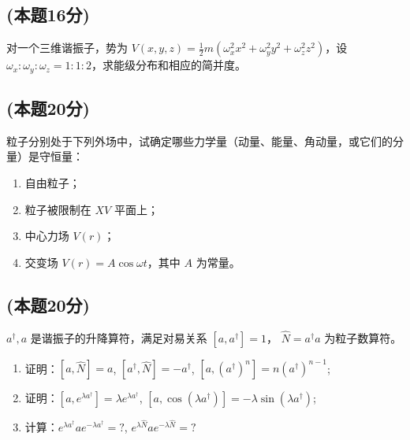 \subsection{(本题16分)}
对一个三维谐振子，势为 $V(x, y, z) = \frac{1}{2}m \left( \omega_x^2 x^2 + \omega_y^2 y^2 + \omega_z^2 z^2 \right)$，设 $\omega_x : \omega_y : \omega_z = 1 : 1 : 2$，求能级分布和相应的简并度。
\subsection{(本题20分)}
粒子分别处于下列外场中，试确定哪些力学量（动量、能量、角动量，或它们的分量）是守恒量：
\begin{enumerate}
\item 自由粒子；
\item 粒子被限制在 $XV$ 平面上；
\item 中心力场 $V(r)$；
\item 交变场 $V(r) = A \cos \omega t$，其中 $A$ 为常量。
\end{enumerate}
\subsection{(本题20分)}
$a^{\dagger}, a$ 是谐振子的升降算符，满足对易关系 $[a, a^{\dagger}] = 1$， $\hat{N} = a^{\dagger}a$ 为粒子数算符。
\begin{enumerate}
\item 证明：$[a, \hat{N}] = a$, $[a^{\dagger}, \hat{N}] = -a^{\dagger}$, $[a, (a^{\dagger})^n] = n(a^{\dagger})^{n-1}$;
\item 证明：$[a, e^{\lambda a^{\dagger}}] = \lambda e^{\lambda a^{\dagger}}$, $[a, \cos(\lambda a^{\dagger})] = -\lambda \sin(\lambda a^{\dagger})$;
\item 计算：$e^{\lambda a^{\dagger}} a e^{-\lambda a^{\dagger}} = ?$, $e^{\lambda \hat{N}} a e^{-\lambda \hat{N}} = ?$
\end{enumerate}
